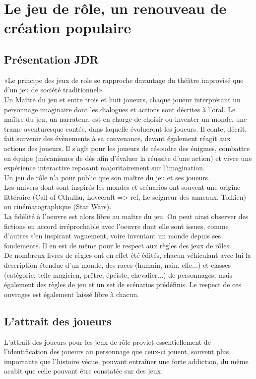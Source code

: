 \documentclass[a4paper,12pt,final,oneside]{article}
\begin{document}
\section{Le jeu de rôle, un renouveau de création populaire}
\cite{caira2007jeux}
\subsection{Présentation JDR}
«Le principe des jeux de role se rapproche davantage du théâtre improvisé que d'un jeu de société traditionnel» \cite{cristofari2010lecteur}\\
Un Maître du jeu et entre trois et huit joueurs, chaque joueur interprétant un personnage imaginaire dont les dialogues et actions sont décrites à l'oral. Le maître du jeu, un narrateur, est en charge de choisir ou inventer un monde, une trame aventuresque contée, dans laquelle évolueront les joueurs. Il conte, décrit, fait survenir des évènements à sa convenance, devant également réagit aux actions des joueurs. Il s'agît pour les joueurs de résoudre des énigmes, combattre en équipe (mécanismes de dés afin d'évaluer la réussite d'une action) et vivre une expérience interactive reposant majoritairement sur l'imagination.\\
Un jeu de rôle n'a pour public que son maître du jeu et ses joueurs.\\

Les univers dont sont inspirés les mondes et scénarios ont souvent une origine littéraire (Call of Cthulhu, Lovecraft => ref, Le seigneur des anneaux, Tolkien) ou cinématographique (Star Wars).\\
La fidélité à l'oeuvre est alors libre au maître du jeu. On peut ainsi observer des fictions en accord irréprochable avec l'oeuvre dont elle sont issues, comme d'autres s'en inspirant vaguement, voire inventant un monde depuis ses fondements. Il en est de même pour le respect aux règles des jeux de rôles.\\
De nombreux livres de règles ont en effet été édités, chacun véhiculant avec lui la description étendue d'un monde, des races (humain, nain, elfe...) et classes (catégorie, telle magicien, prêtre, épéiste, chevalier...) de personnages, mais également des règles de jeu et un set de scénarios prédéfinis. Le respect de ces ouvrages est également laissé libre à chacun.\\

\subsection{L'attrait des joueurs}
L'attrait des joueurs pour les jeux de rôle proviet essentiellement de l'identification des joueurs au personnage que ceux-ci jouent, souvent plus importante que l'histoire vécue, pouvant entraîner une forte addiction, du même acabit que celle pouvant être constatée sur des jeux
\end{document}

